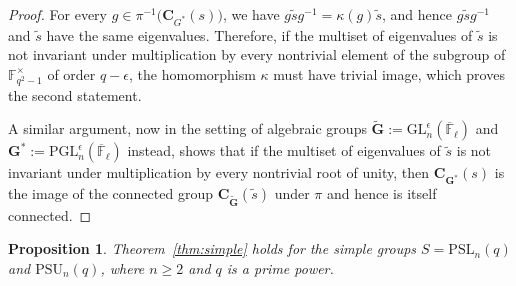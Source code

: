 \documentclass[12pt]{amsart}
\newtheorem{proposition}[theorem]{Proposition}
\theoremstyle{definition}
\numberwithin{equation}{section}
\newcommand{\GL}{{\mathrm {GL}}}
\newcommand{\PGL}{{\mathrm {PGL}}}
\newcommand{\PSL}{{\mathrm {PSL}}}
\newcommand{\PSU}{{\mathrm {PSU}}}
\newcommand{\FF}{{\mathbb F}}
\newcommand{\bC}{{\mathbf{C}}}
\newcommand{\bG}{{\mathbf{G}}}
\begin{document}
\begin{proof}
For every $g \in \pi^{-1}\bigl(\bC_{G^*}(s)\bigr)$, we have
$g\widetilde{s}g^{-1} = \kappa(g)\widetilde{s}$, and hence
$g\widetilde{s}g^{-1}$ and $\widetilde{s}$ have the same
eigenvalues. Therefore, if the multiset of eigenvalues of
$\widetilde{s}$ is not invariant under multiplication by every
nontrivial element of the subgroup of $\FF_{q^2-1}^\times$ of order
$q-\epsilon$, the homomorphism $\kappa$ must have trivial image,
which proves the second statement.

A similar argument, now in the setting of algebraic groups
$\widetilde{\bG} := \GL^\epsilon_n(\overline{\FF}_{\ell})$ and
${\bG^*} := \PGL^\epsilon_n(\overline{\FF}_{\ell})$ instead, shows
that if the multiset of eigenvalues of $\widetilde{s}$ is not
invariant under multiplication by every nontrivial root of unity,
then $\bC_{\bG^*}(s)$ is the image of the connected group
$\bC_{\widetilde{\bG}}(\widetilde{s})$ under $\pi$ and hence is
itself connected.
\end{proof}


\begin{proposition}\label{prop:linear-unitary}
Theorem~\ref{thm:simple} holds for the simple groups $S=\PSL_n(q)$
and $\PSU_n(q)$, where $n\geq 2$ and $q$ is a prime power.
\end{proposition}
\end{document}
